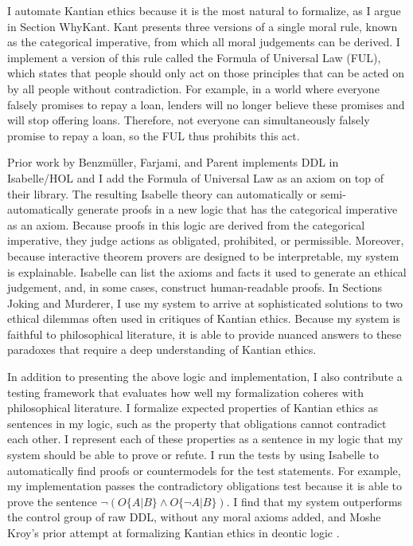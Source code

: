 \begin{isabellebody}
\begin{isamarkuptext}
I automate Kantian ethics because it is the most natural to formalize, as I argue in Section WhyKant. 
Kant presents three versions of a single moral rule, known as the categorical imperative, from which 
all moral judgements can be derived. I implement a version of this rule called the Formula of Universal 
Law (FUL), which states that people should only act on those principles that can be acted on by all 
people without contradiction. For example, in a world where everyone falsely promises to repay a loan, 
lenders will no longer believe these promises and will stop offering loans. Therefore, not everyone 
can simultaneously falsely promise to repay a loan, so the FUL thus prohibits this act.

Prior work by Benzmüller, Farjami, and Parent \citep{logikey, BFP} implements DDL in Isabelle/HOL and 
I add the Formula of Universal Law as an axiom on top of their library. The resulting Isabelle theory 
can automatically or semi-automatically generate proofs in a new logic that has the categorical 
imperative as an axiom. Because proofs in this logic are derived from the categorical imperative, 
they judge actions as obligated, prohibited, or permissible. Moreover, because interactive 
theorem provers are designed to be interpretable, my system is explainable. Isabelle can list 
the axioms and facts it used to generate an ethical judgement, and, in some cases, construct 
human-readable proofs. In Sections Joking and Murderer, I use my system to arrive at 
sophisticated solutions to two ethical dilemmas often used in critiques of Kantian ethics. Because 
my system is faithful to philosophical literature, it is able to provide nuanced answers to these paradoxes
that require a deep understanding of Kantian ethics. 

In addition to presenting the above logic and implementation, I also contribute a testing framework 
that evaluates how well my formalization coheres with philosophical literature. I formalize expected 
properties of Kantian ethics as sentences in my logic, such as the property that obligations cannot 
contradict each other. I represent each of these properties as a sentence in my logic that my system 
should be able to prove or refute. I run the tests by using Isabelle to automatically find proofs or 
countermodels for the test statements. For example, my implementation passes the contradictory 
obligations test because it is able to prove the sentence $\neg (O\{A|B\} \wedge O\{\neg A | B\})$. 
I find that my system outperforms the control group of raw DDL, without any moral axioms added, and 
Moshe Kroy's prior attempt at formalizing Kantian ethics in deontic logic \citep{kroy}.


\end{isamarkuptext}
\end{isabellebody}
